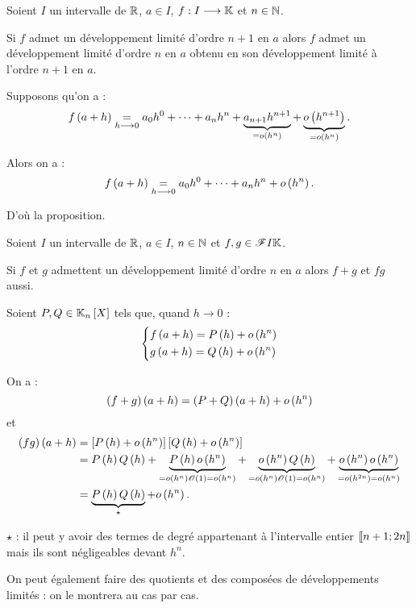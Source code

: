 \begin{prop}
Soient \(I\) un intervalle de \(\mathbb{R}\), \(a\in I\), \(f:I\longrightarrow\mathbb{K}\) et \(n\in\mathbb{N}\).

Si \(f\) admet un développement limité d'ordre \(n+1\) en \(a\) alors \(f\) admet un développement limité d'ordre \(n\) en \(a\) obtenu en  son développement limité à l'ordre \(n+1\) en \(a\).
\end{prop}

\begin{dem}
Supposons qu'on a : \[f\left(a+h\right)\underset{h\longrightarrow0}{=}a_0h^0+\dots+a_nh^n+\underbrace{a_{n+1}h^{n+1}}_{=o\left(h^n\right)}+\underbrace{o\left(h^{n+1}\right)}_{=o\left(h^n\right)}.\]

Alors on a : \[f\left(a+h\right)\underset{h\longrightarrow0}{=}a_0h^0+\dots+a_nh^n+o\left(h^n\right).\]

D'où la proposition.
\end{dem}

\begin{prop}
Soient \(I\) un intervalle de \(\mathbb{R}\), \(a\in I\), \(n\in\mathbb{N}\) et \(f,g\in\mathscr{F}{I}{\mathbb{K}}\).

Si \(f\) et \(g\) admettent un développement limité d'ordre \(n\) en \(a\) alors \(f+g\) et \(fg\) aussi.
\end{prop}

\begin{dem}
Soient \(P,Q\in\polydeg{n}\) tels que, quand \(h\to0\) : \[\begin{dcases}
f\left(a+h\right)=P\left(h\right)+o\left(h^n\right) \\
g\left(a+h\right)=Q\left(h\right)+o\left(h^n\right)
\end{dcases}\]

On a : \[\left(f+g\right)\left(a+h\right)=\left(P+Q\right)\left(a+h\right)+o\left(h^n\right)\] et \[\begin{aligned}
\left(fg\right)\left(a+h\right)&=\left[P\left(h\right)+o\left(h^n\right)\right]\left[Q\left(h\right)+o\left(h^n\right)\right] \\
&=P\left(h\right)Q\left(h\right)+\underbrace{P\left(h\right)o\left(h^n\right)}_{=o\left(h^n\right)\mathscr{O}\left(1\right)=o\left(h^n\right)}+\underbrace{o\left(h^n\right)Q\left(h\right)}_{=o\left(h^n\right)\mathscr{O}\left(1\right)=o\left(h^n\right)}+\underbrace{o\left(h^n\right)o\left(h^n\right)}_{=o\left(h^{2n}\right)=o\left(h^n\right)} \\
&=\underbrace{P\left(h\right)Q\left(h\right)}_{\star}+o\left(h^n\right).
\end{aligned}\]

\(\star\) : il peut y avoir des termes de degré appartenant à l'intervalle entier \(\left\llbracket n+1;2n\right\rrbracket\) mais ils sont négligeables devant \(h^n\).
\end{dem}

\begin{rem}
On peut également faire des quotients et des composées de développements limités : on le montrera au cas par cas.
\end{rem}

